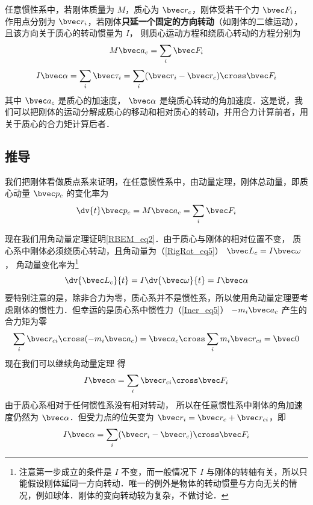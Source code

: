 

任意惯性系中，若刚体质量为 $M$，质心为 $\bvec r_c$，刚体受若干个力 $\bvec F_i$，作用点分别为 $\bvec r_i$，若刚体\textbf{只延一个固定的方向转动}（如刚体的二维运动），且该方向关于质心的转动惯量为 $I$， 则质心运动方程和绕质心转动的方程分别为
\begin{equation}\label{RBEM_eq1}
M\bvec a_c = \sum_i \bvec F_i
\end{equation}
\begin{equation}\label{RBEM_eq2}
I \bvec \alpha = \sum_i \bvec \tau_i = \sum_i (\bvec r_i-\bvec r_c) \cross  \bvec F_i
\end{equation}
其中 $\bvec a_c$ 是质心的加速度， $\bvec \alpha$ 是绕质心转动的角加速度．这是说，我们可以把刚体的运动分解成质心的移动和相对质心的转动，并用合力计算前者，用关于质心的合力矩计算后者．

\subsection{推导}
我们把刚体看做质点系来证明，在任意惯性系中，由动量定理，刚体总动量，即质心动量 $\bvec p_c$ 的变化率为
\begin{equation}
\dv{t} \bvec p_c = M \bvec a_c = \sum_i \bvec F_i
\end{equation}

现在我们用角动量定理证明\autoref{RBEM_eq2}．由于质心与刚体的相对位置不变，%
质心系中刚体必须绕质心转动，且角动量为（\autoref{RigRot_eq5}） $\bvec L_c = I \bvec\omega$， 角动量变化率为\footnote{注意第一步成立的条件是 $I$ 不变，而一般情况下 $I$ 与刚体的转轴有关，所以只能假设刚体延同一方向转动．唯一的例外是物体的转动惯量与方向无关的情况，例如球体．刚体的变向转动较为复杂，不做讨论．}
\begin{equation}
\dv{\bvec L_c}{t} = I \dv{\bvec \omega}{t} = I \bvec\alpha
\end{equation}
要特别注意的是，除非合力为零，质心系并不是惯性系，所以使用角动量定理要考虑刚体的惯性力．但幸运的是质心系中惯性力（\autoref{Iner_eq5}） $-m_i \bvec a_c$ 产生的合力矩为零
\begin{equation}
\sum_i \bvec r_{ci}\cross (-m_i \bvec a_{c}) = \bvec a_{c} \cross \sum_i m_i \bvec r_{ci} = \bvec 0
\end{equation}
现在我们可以继续角动量定理 得
\begin{equation}
I \bvec\alpha = \sum_i \bvec r_{ci} \cross  \bvec F_i
\end{equation}
由于质心系相对于任何惯性系没有相对转动， 所以在任意惯性系中刚体的角加速度仍然为 $\bvec\alpha$．但受力点的位矢变为 $\bvec r_i = \bvec r_c + \bvec r_{ci}$，即
\begin{equation}\label{RBEM_eq7}
I \bvec \alpha = \sum_i (\bvec r_i-\bvec r_c) \cross  \bvec F_i
\end{equation}


